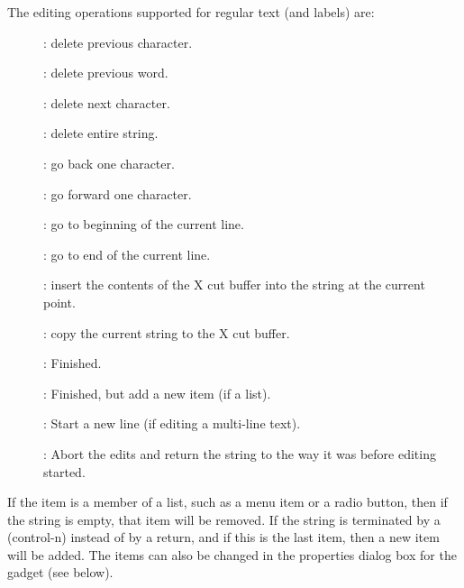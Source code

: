 The editing operations supported for regular text (and labels) are:
\label{editingcommands}
\begin{description}
\item[] : delete previous character.

\item[] : delete previous word.

\item[] : delete next character.

\item[] : delete entire string.

\item[] : go back one character.

\item[] : go forward one character.

\item[] : go to beginning of the current line.

\item[] : go to end of the current line.

\item[] : insert the contents of the X cut buffer into the string at the
current point.

\item[] : copy the current string to the X cut buffer.

\item[] : Finished.

\item[] : Finished, but add a new item (if a list).

\item[] : Start a new line (if editing a multi-line text).

\item[] : Abort the edits and return the string to the way it was before
editing started.
\end{description}

\vspace{.5 line}
If the item is a member of a list, such as a menu item or a radio button,
then if the string is empty, that item will be removed.  If the string is
terminated by a  (control-n) instead of by a return, and if this is the
last item, then a new item will be added.  The items can also be changed in
the properties dialog box for the gadget (see below).

